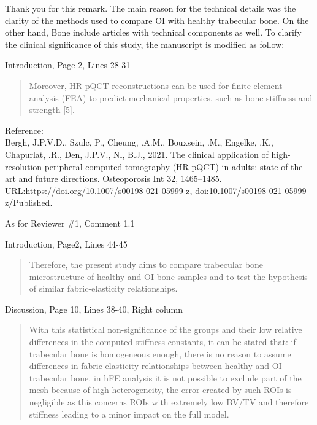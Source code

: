 \documentclass{AR2RC}
\begin{document}
\AR Thank you for this remark. The main reason for the technical details was the clarity of the methods used to compare OI with healthy trabecular bone. On the other hand, Bone include articles with technical components as well. To clarify the clinical significance of this study, the manuscript is modified as follow:

Introduction, Page 2, Lines 28-31
\begin{quote}
	Moreover, HR-pQCT reconstructions can be used for finite element analysis (FEA) to predict mechanical properties, such as bone stiffness and strength [5]. 
\end{quote}

Reference:\\
Bergh, J.P.V.D., Szulc, P., Cheung, .A.M., Bouxsein, .M., Engelke, .K., Chapurlat, .R., Den, J.P.V., Nl, B.J., 2021. The clinical application of high-resolution peripheral computed tomography (HR-pQCT) in adults: state of the art and future directions. Osteoporosis Int 32, 1465–1485. URL:https://doi.org/10.1007/s00198-021-05999-z, doi:10.1007/s00198-021-05999-z/Published.\par

As for Reviewer \#1, Comment 1.1\par

Introduction, Page2, Lines 44-45
\begin{quote}
	Therefore, the present study aims to compare trabecular bone microstructure of healthy and OI bone samples and to test the hypothesis of similar fabric-elasticity relationships.
\end{quote}

Discussion, Page 10, Lines 38-40, Right column
\begin{quote}
	With this statistical non-significance of the groups and their low relative differences in the computed stiffness constants, it can be stated that: if trabecular bone is homogeneous enough, there is no reason to assume differences in fabric-elasticity relationships between healthy and OI trabecular bone.  in hFE analysis  it is not possible to exclude part of the mesh because of high heterogeneity, the error created by such ROIs is negligible as this  concerns ROIs with extremely low BV/TV and therefore stiffness leading to a minor impact on the full model.
\end{quote}
\end{document}
